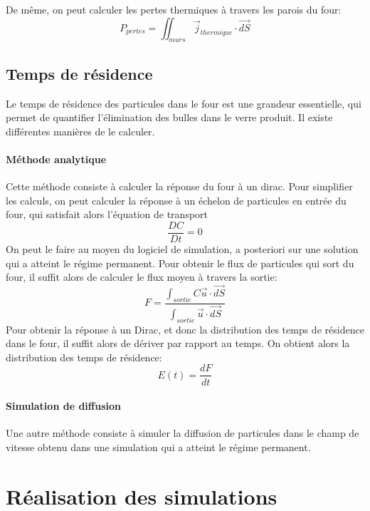 \documentclass[12pt, a4paper, french, BCOR = 0pt, DIV = 10]{scrartcl}
\begin{document}
    De même, on peut calculer les pertes thermiques à travers les parois du four:
    $$
        P_{pertes} = \iint_{murs} \vec{j}_{thermique} \cdot \vec{dS}
    $$

    \subsection{Temps de résidence}
    Le temps de résidence des particules dans le four est une grandeur essentielle, qui permet de quantifier l'élimination des bulles dans le verre produit. Il existe différentes manières de le calculer.
    \paragraph{Méthode analytique}
    Cette méthode consiste à calculer la réponse du four à un dirac. Pour simplifier les calculs, on peut calculer la réponse à un échelon de particules en entrée du four, qui satisfait alors l'équation de transport $$\frac{DC}{Dt} = 0 $$On peut le faire au moyen du logiciel de simulation, a posteriori sur une solution qui a atteint le régime permanent. Pour obtenir le flux de particules qui sort du four, il suffit alors de calculer le flux moyen à travers la sortie: $$
        F = \frac{\int_{sortie} C\vec{u} \cdot \vec{dS}}{\int_{sortie} \vec{u} \cdot \vec{dS}}
    $$
    Pour obtenir la réponse à un Dirac, et donc la distribution des temps de résidence dans le four, il suffit alors de dériver par rapport au temps. On obtient alors la distribution des temps de résidence: $$
        E(t) = \frac{dF}{dt}
    $$


    

    \paragraph{Simulation de diffusion}
    Une autre méthode consiste à simuler la diffusion de particules dans le champ de vitesse obtenu dans une simulation qui a atteint le régime permanent. 

	
	\section{Réalisation des simulations}
\end{document}
